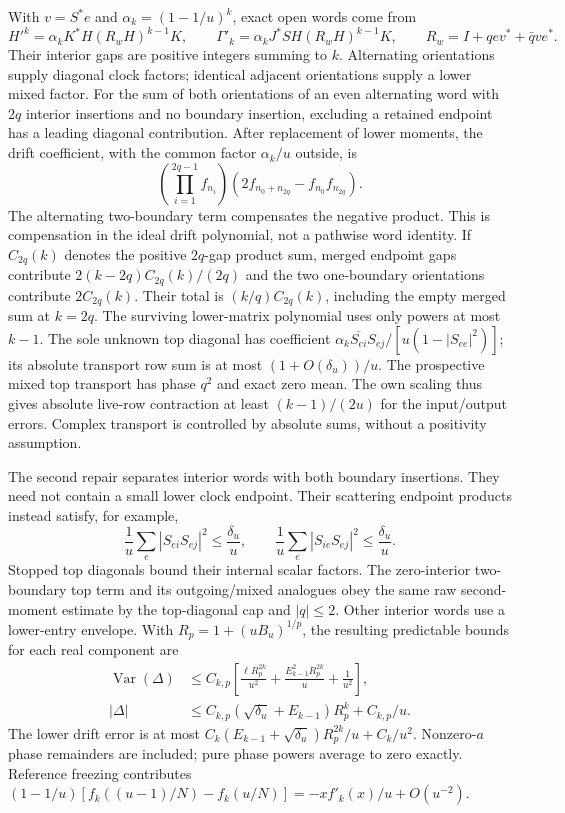 With $v=S^*e$ and $\alpha_k=(1-1/u)^k$, exact open words come from
\[
 H'^k=\alpha_kK^*H(R_wH)^{k-1}K,\qquad
 \Gamma'_k=\alpha_kJ^*SH(R_wH)^{k-1}K,\qquad
 R_w=I+qev^*+\bar qve^*.
\]
Their interior gaps are positive integers summing to $k$. Alternating
orientations supply diagonal clock factors; identical adjacent orientations
supply a lower mixed factor. For the sum of both orientations of an even alternating word with $2q$
interior insertions and no boundary insertion, excluding a retained endpoint
has a leading diagonal contribution. After replacement of lower moments,
the drift coefficient, with the common factor $\alpha_k/u$ outside, is
\[
 \left(\prod_{i=1}^{2q-1}f_{n_i}\right)
 \left(2f_{n_0+n_{2q}}-f_{n_0}f_{n_{2q}}\right).
\]
The alternating two-boundary term compensates the negative product.
This is compensation in the ideal drift polynomial, not a pathwise word
identity. If $C_{2q}(k)$ denotes the positive $2q$-gap product sum,
merged endpoint gaps contribute $2(k-2q)C_{2q}(k)/(2q)$ and the two
one-boundary orientations contribute $2C_{2q}(k)$. Their total is
$(k/q)C_{2q}(k)$, including the empty merged sum at $k=2q$.
The surviving lower-matrix polynomial uses only powers at most $k-1$.
The sole unknown top diagonal has coefficient
$\alpha_k\overline{S_{ei}}S_{ej}/[u(1-|S_{ee}|^2)]$;
its absolute transport row sum is at most $(1+O(\delta_u))/u$.
The prospective mixed top transport has phase $q^2$ and exact zero mean.
The own scaling thus gives absolute live-row contraction at least
$(k-1)/(2u)$ for the input/output errors. Complex transport is controlled
by absolute sums, without a positivity assumption.

The second repair separates interior words with both boundary insertions.
They need not contain a small lower clock endpoint. Their scattering
endpoint products instead satisfy, for example,
\[
 \frac1u\sum_e|S_{ei}S_{ej}|^2\le\frac{\delta_u}{u},\qquad
 \frac1u\sum_e|S_{ie}S_{ej}|^2\le\frac{\delta_u}{u}.
\]
Stopped top diagonals bound their internal scalar factors. The zero-interior
two-boundary top term and its outgoing/mixed analogues obey the same raw
second-moment estimate by the top-diagonal cap and $|q|\le2$. Other interior
words use a lower-entry envelope. With $R_p=1+(uB_u)^{1/p}$, the resulting
predictable bounds for each real component are
\begin{align*}
 \operatorname{Var}(\Delta)&\le C_{k,p}
 \left[\frac{\ell R_p^{2k}}{u^2}
       +\frac{E_{k-1}^2R_p^{2k}}u+\frac1{u^2}\right],\\
 |\Delta|&\le C_{k,p}(\sqrt{\delta_u}+E_{k-1})R_p^k+C_{k,p}/u.
\end{align*}
The lower drift error is at most
$C_k(E_{k-1}+\sqrt{\delta_u})R_p^{2k}/u+C_k/u^2$.
Nonzero-$a$ phase remainders are included; pure phase powers average to
zero exactly. Reference freezing contributes
$(1-1/u)[f_k((u-1)/N)-f_k(u/N)]=-xf'_k(x)/u+O(u^{-2})$.

